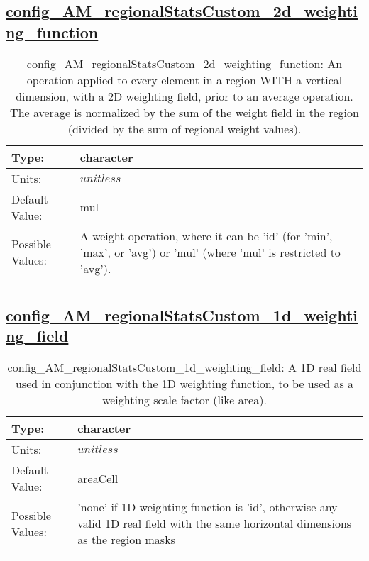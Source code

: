 \subsection[config\_AM\_regionalStatsCustom\_2d\_weighting\_function]{\hyperref[sec:nm_tab_AM_regionalStatsCustom]{config\_AM\_regionalStatsCustom\_2d\_weighting\_function}}
\label{subsec:nm_sec_config_AM_regionalStatsCustom_2d_weighting_function}
\begin{center}
\begin{longtable}{| p{2.0in} || p{4.0in} |}
    \hline
    Type: & character \\
    \hline
    Units: & $unitless$ \\
    \hline
    Default Value: & mul \\
    \hline
    Possible Values: & A weight operation, where it can be 'id' (for 'min', 'max', or 'avg') or 'mul' (where 'mul' is restricted to 'avg'). \\
    \hline
    \caption{config\_AM\_regionalStatsCustom\_2d\_weighting\_function: An operation applied to every element in a region WITH a vertical dimension, with a 2D weighting field, prior to an average operation. The average is normalized by the sum of the weight field in the region (divided by the sum of regional weight values).}
\end{longtable}
\end{center}
\subsection[config\_AM\_regionalStatsCustom\_1d\_weighting\_field]{\hyperref[sec:nm_tab_AM_regionalStatsCustom]{config\_AM\_regionalStatsCustom\_1d\_weighting\_field}}
\label{subsec:nm_sec_config_AM_regionalStatsCustom_1d_weighting_field}
\begin{center}
\begin{longtable}{| p{2.0in} || p{4.0in} |}
    \hline
    Type: & character \\
    \hline
    Units: & $unitless$ \\
    \hline
    Default Value: & areaCell \\
    \hline
    Possible Values: & 'none' if 1D weighting function is 'id', otherwise any valid 1D real field with the same horizontal dimensions as the region masks \\
    \hline
    \caption{config\_AM\_regionalStatsCustom\_1d\_weighting\_field: A 1D real field used in conjunction with the 1D weighting function, to be used as a weighting scale factor (like area).}
\end{longtable}
\end{center}
